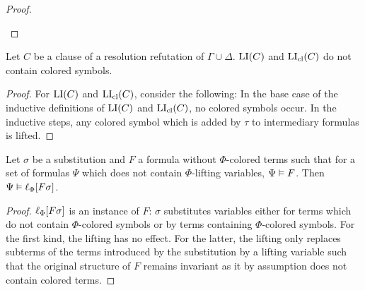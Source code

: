 \documentclass[,%
	draft=false,%
	numbers=noendperiod
	11pt,
	a4paper,
	oneside,%
	openany,
]{memoir}
\begin{document}
\begin{proof}
\begin{description}
			\begin{comment}
				Let $l$ and $l'$ be the resolved or factorised literals.
				By the induction hypothesis,
				$l\cll = \lifboth{l}$
				and
				$l'\cll = \lifboth{l'}$.

				By a similar reasoning as above, we get that $\lifboth{\lifboth{\lambda}\tau} = \lifboth{\lambda\sigma}$ for any literal $\lambda$ in $\bbar C$.

				$\lifboth{\lambda\cll\tau} = \lifboth{\lifboth{\lambda}\tau}$
				But as $l\sigma = l'\sigma$ and

				$\lifboth{\lifboth{l}\tau } =
				\lifboth{\lifboth{l'}\tau }
				$

				As no lifting variables occur in $l$ or $l'$, we get that $l\tau = l'\tau$, which we can lift to $\lifboth{l\tau} = \lifboth{l'\tau}$.

				Note that $l\sigma = l'\sigma$.

				$l\cll = \lifboth{l}$

				$\lifboth{ \lifboth{l} \tau} = \lifboth{l\tau}$

			\end{comment}
	\end{description}
\end{proof}


\begin{lemma}
	\label{lemma:no_colored_terms}
	Let $C$ be a clause of a resolution refutation of $\Gamma\cup\Delta$.
	$\operatorname{LI}(C)$ and $\operatorname{LI}_{\operatorname{cl}}(C)$ do not contain colored symbols.
\end{lemma}
\begin{proof}
	For $\operatorname{LI}(C)$ and $\operatorname{LI}_{\operatorname{cl}}(C)$, consider the following:
	In the base case of the inductive definitions of $\operatorname{LI}(C)$ and $\operatorname{LI}_{\operatorname{cl}}(C)$, no colored symbols occur.
	In the inductive steps, any colored symbol which is added by $\tau$ to intermediary formulas is lifted.
\end{proof}

\begin{lemma}
	\label{lemma:substitute_and_lift}
	Let $\sigma$ be a substitution and $F$ a formula without $\Phi$-colored terms such that for a set of formulas $\Psi$ which does not contain $\Phi$-lifting variables, $\Psi \vDash F$.
	Then $\Psi \vDash \ell_{\Phi}[F\sigma]$.
\end{lemma}
\begin{proof}
	$\ell_{\Phi}[F\sigma]$ is an instance of $F$:
	$\sigma$ substitutes variables either for terms which do not contain $\Phi$-colored symbols or by terms containing $\Phi$-colored symbols.
	For the first kind, the lifting has no effect.
	For the latter, the lifting only replaces subterms of the terms introduced by the substitution by a lifting variable such that the original structure of $F$ remains invariant as it by assumption does not contain colored terms.
\end{proof}
\end{document}
